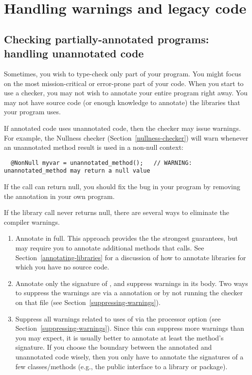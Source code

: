 \section{Handling warnings and legacy code\label{warnings-and-legacy}}


\subsection{Checking partially-annotated programs:  handling unannotated code\label{unannotated-code}}

Sometimes, you wish to type-check only part of your program.  
You might focus on the most mission-critical or error-prone part of your
code.  When you start to use a checker, you may not wish to annotate
your entire program right away.  You may not have source code (or
enough knowledge to annotate) the libraries that your program uses.

If annotated code uses unannotated code, then the checker may issue
warnings.  For example, the Nullness checker (Section~\ref{nullness-checker}) will
warn whenever an unannotated method result is used in a non-null context:

\begin{Verbatim}
  @NonNull myvar = unannotated_method();   // WARNING: unannotated_method may return a null value
\end{Verbatim}

If the call can return null, you should fix the bug in your program by
removing the  annotation in your own program.

If the library call never returns null,
there are several ways to eliminate the compiler warnings.
\begin{enumerate}
\item Annotate  in full.  This approach provides the
  the strongest guarantees, but may require you to annotate additional
  methods that  calls.  See
  Section~\ref{annotating-libraries} for a discussion of how to annotate
  libraries for which you have no source code.
\item Annotate only the signature of , and
  suppress warnings in its body.  Two ways to suppress the warnings are via a
   annotation or by not running the checker on that
  file (see Section~\ref{suppressing-warnings}).
\item Suppress all warnings related to uses of 
  via the  processor option
  (see Section~\ref{suppressing-warnings}).
  Since this can suppress more warnings than you may expect,
  it is usually better to annotate at least the method's signature.  If you
  choose the boundary between the annotated and unannotated code wisely,
  then you only have to annotate the signatures of a few classes/methods
  (e.g., the public interface to a library or package).
  
\end{enumerate}

